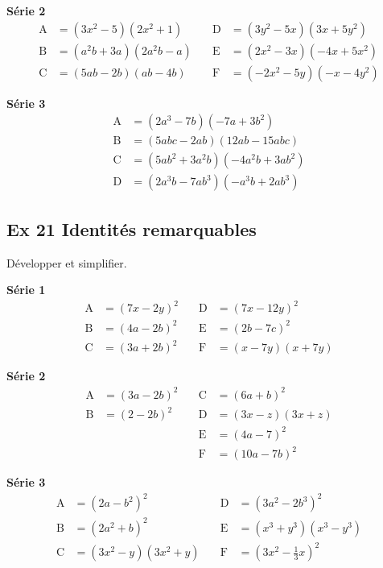 \documentclass[a4paper,11pt]{article}
\begin{document}
\textbf{Série 2}
\[
\begin{aligned}
\mathrm{A}&=(3x^{2}-5)(2x^{2}+1) &\quad \mathrm{D}&=(3y^{2}-5x)(3x+5y^{2})\\
\mathrm{B}&=(a^{2}b+3a)(2a^{2}b-a) &\quad \mathrm{E}&=(2x^{2}-3x)(-4x+5x^{2})\\
\mathrm{C}&=(5ab-2b)(ab-4b) &\quad \mathrm{F}&=(-2x^{2}-5y)(-x-4y^{2})
\end{aligned}
\]

\textbf{Série 3}
\[
\begin{aligned}
\mathrm{A}&=(2a^{3}-7b)(-7a+3b^{2})\\
\mathrm{B}&=(5abc-2ab)(12ab-15abc)\\
\mathrm{C}&=(5ab^{2}+3a^{2}b)(-4a^{2}b+3ab^{2})\\
\mathrm{D}&=(2a^{3}b-7ab^{3})(-a^{3}b+2ab^{3})
\end{aligned}
\]

\subsection*{Ex 21 \; Identités remarquables}
Développer et simplifier.

\textbf{Série 1}
\[
\begin{aligned}
\mathrm{A}&=(7x-2y)^{2} &\quad \mathrm{D}&=(7x-12y)^{2}\\
\mathrm{B}&=(4a-2b)^{2} &\quad \mathrm{E}&=(2b-7c)^{2}\\
\mathrm{C}&=(3a+2b)^{2} &\quad \mathrm{F}&=(x-7y)(x+7y)
\end{aligned}
\]

\textbf{Série 2}
\[
\begin{aligned}
\mathrm{A}&=(3a-2b)^{2} &\quad \mathrm{C}&=(6a+b)^{2}\\
\mathrm{B}&=(2-2b)^{2} &\quad \mathrm{D}&=(3x-z)(3x+z)\\
& &\quad \mathrm{E}&=(4a-7)^{2}\\
& &\quad \mathrm{F}&=(10a-7b)^{2}
\end{aligned}
\]

\textbf{Série 3}
\[
\begin{aligned}
\mathrm{A}&=(2a-b^{2})^{2} &\quad \mathrm{D}&=(3a^{2}-2b^{3})^{2}\\
\mathrm{B}&=(2a^{2}+b)^{2} &\quad \mathrm{E}&=(x^{3}+y^{3})(x^{3}-y^{3})\\
\mathrm{C}&=(3x^{2}-y)(3x^{2}+y) &\quad \mathrm{F}&=\left(3x^{2}-\tfrac{1}{3}x\right)^{2}
\end{aligned}
\]
\end{document}
